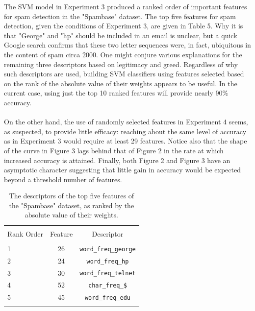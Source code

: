 \documentclass[12pt]{article}
\begin{document}
The SVM model in Experiment 3 produced a ranked order of important features for spam detection in the "Spambase" dataset. The top five features for spam detection, given the conditions of Experiment 3, are given in Table 5. Why it is that "George" and "hp" should be included in an email is unclear, but a quick Google search confirms that these two letter sequences were, in fact, ubiquitous in the content of spam circa 2000. One might conjure various explanations for the remaining three descriptors based on legitimacy and greed. Regardless of why such descriptors are used, building SVM classifiers using features selected based on the rank of the absolute value of their weights appears to be useful. In the current case, using just the top 10 ranked features will provide nearly 90\% accuracy.\\
\vspace{5cm}\\
On the other hand, the use of randomly selected features in Experiment 4 seems, as suspected, to provide little efficacy: reaching about the same level of accuracy as in Experiment 3 would require at least 29 features. Notice also that the shape of the curve in Figure 3 lags behind that of Figure 2 in the rate at which increased accuracy is attained. Finally, both Figure 2 and Figure 3 have an asymptotic character suggesting that little gain in accuracy would be expected beyond a threshold number of features.

\begin{table}[!htbp] \centering 
  \caption{The descriptors of the top five features of the "Spambase" dataset, as ranked by the absolute value of their weights.} 
  \label{} 
\begin{tabular}{lcc} 
\\[-1.8ex]\hline 
\hline \\[-1.8ex] 
 {Rank Order} & {Feature} & {Descriptor}\\
\hline \\[-1.8ex]
1 & 26 &  \verb|word_freq_george|\\
2 & 24 &  \verb|word_freq_hp|\\
3 & 30 &  \verb|word_freq_telnet|\\
4 & 52 &  \verb|char_freq_$|\\
5 & 45 &  \verb|word_freq_edu|\\
\hline \\[-1.8ex]
\end{tabular} 
\end{table}
\end{document}
